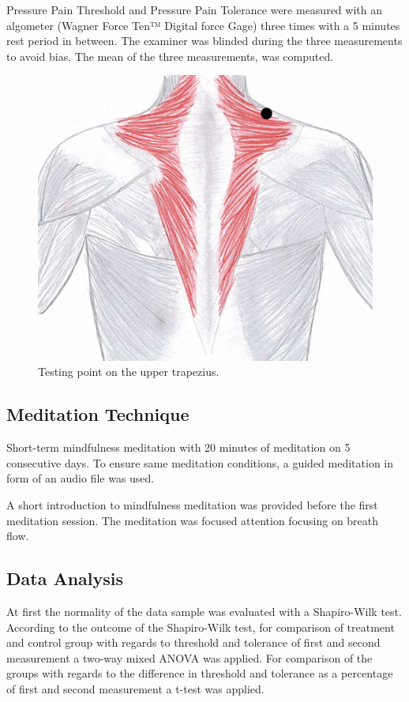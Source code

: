 Pressure Pain Threshold and Pressure Pain Tolerance were measured with an algometer (Wagner Force Ten™ Digital force Gage) three times with a 5 minutes rest period in between. The examiner was blinded during the three measurements to avoid bias. The mean of the three measurements, was computed. 

\begin{figure}[H]
\centering
\includegraphics[width=.7\columnwidth]{../figures/trapezius}
\caption{Testing point on the upper trapezius.}
\label{fig:trapezius}
\end{figure} \vspace{-.5cm}


\subsection{Meditation Technique}
Short-term mindfulness meditation with 20 minutes of meditation on 5 consecutive days. To ensure same meditation conditions, a guided meditation in form of an audio file was used. 

A short introduction to mindfulness meditation was provided before the first meditation session. The meditation was focused attention focusing on breath flow.

\subsection{Data Analysis}
At first the normality of the data sample was evaluated with a Shapiro-Wilk test. According to the outcome of the Shapiro-Wilk test, for comparison of treatment and control group with regards to threshold and tolerance of first and second measurement a two-way mixed ANOVA was applied. For comparison of the groups with regards to the difference in threshold and tolerance as a percentage of first and second measurement a t-test was applied.


